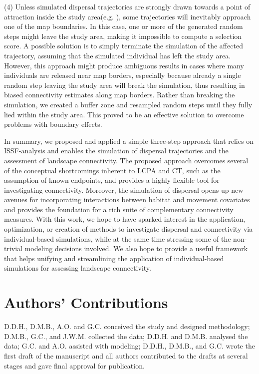 \documentclass[abstract=on,10pt,a4paper,bibliography=totocnumbered]{article}
\begin{document}
(4) Unless simulated dispersal trajectories are strongly drawn towards a point
of attraction inside the study area(e.g. \citealp{Signer.2017}), some
trajectories will inevitably approach one of the map boundaries. In this case,
one or more of the generated random steps might leave the study area, making it
impossible to compute a selection score. A possible solution is to simply
terminate the simulation of the affected trajectory, assuming that the simulated
individual has left the study area. However, this approach might produce
ambiguous results in cases where many individuals are released near map borders,
especially because already a single random step leaving the study area will
break the simulation, thus resulting in biased connectivity estimates along map
borders. Rather than breaking the simulation, we created a buffer zone
\citep{Koen.2010} and resampled random steps until they fully lied within the
study area. This proved to be an effective solution to overcome problems with
boundary effects.

In summary, we proposed and applied a simple three-step approach that relies on
ISSF-analysis and enables the simulation of dispersal trajectories and the
assessment of landscape connectivity. The proposed approach overcomes several of
the conceptual shortcomings inherent to LCPA and CT, such as the assumption of
known endpoints, and provides a highly flexible tool for investigating
connectivity. Moreover, the simulation of dispersal opens up new avenues for
incorporating interactions between habitat and movement covariates and provides
the foundation for a rich suite of complementary connectivity measures. With
this work, we hope to have sparked interest in the application, optimization, or
creation of methods to investigate dispersal and connectivity via
individual-based simulations, while at the same time stressing some of the
non-trivial modeling decisions involved. We also hope to provide a useful
framework that helps unifying and streamlining the application of
individual-based simulations for assessing landscape connectivity.

\section{Authors' Contributions}
D.D.H., D.M.B., A.O. and G.C. conceived the study and designed methodology;
D.M.B., G.C., and J.W.M. collected the data; D.D.H. and D.M.B. analysed the
data; G.C. and A.O. assisted with modeling; D.D.H., D.M.B., and G.C. wrote the
first draft of the manuscript and all authors contributed to the drafts at
several stages and gave final approval for publication.
\end{document}
